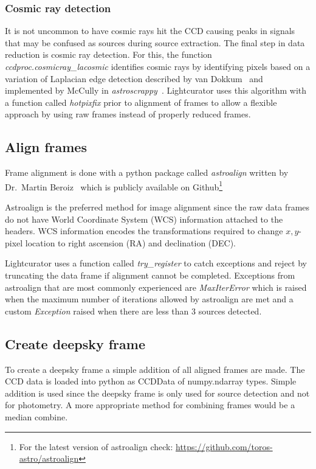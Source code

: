 \subsubsection{Cosmic ray detection}
It is not uncommon to have cosmic rays hit the CCD causing peaks in signals that may be confused as sources during source extraction.
The final step in data reduction is cosmic ray detection.
For this, the function \textit{ccdproc.cosmicray\_lacosmic} identifies cosmic rays by identifying pixels based on a variation of
Laplacian edge detection described by van Dokkum~\cite{lacosmic} and implemented by McCully in \textit{astroscrappy}~\cite{astroscrappy}.
Lightcurator uses this algorithm with a function called \textit{hotpixfix} prior to alignment of frames to allow a flexible
approach by using raw frames instead of properly reduced frames.

\subsection{Align frames}
\label{section:align}
Frame alignment is done with a python package called \textit{astroalign} written by Dr.\ Martin Beroiz~\cite{beroiz_2019} which is publicly
available on Github\footnote{For the latest version of astroalign check: \url{https://github.com/toros-astro/astroalign}}

Astroalign is the preferred method for image alignment since the raw data frames do not have World Coordinate System (WCS) information attached to
the headers.
WCS information encodes the transformations required to change $x,y$-pixel location to right ascension (RA) and declination (DEC).

Lightcurator uses a function called \textit{try\_register} to catch exceptions and reject by truncating the data frame if alignment
cannot be completed.
Exceptions from astroalign that are most commonly experienced are \textit{MaxIterError} which is raised when the maximum number of iterations
allowed by astroalign are met and a custom \textit{Exception} raised when there are less than 3 sources detected.

\subsection{Create deepsky frame}
To create a deepsky frame a simple addition of all aligned frames are made.
The CCD data is loaded into python as CCDData of numpy.ndarray types.
Simple addition is used since the deepsky frame is only used for source detection and not for photometry.
A more appropriate method for combining frames would be a median combine. 

